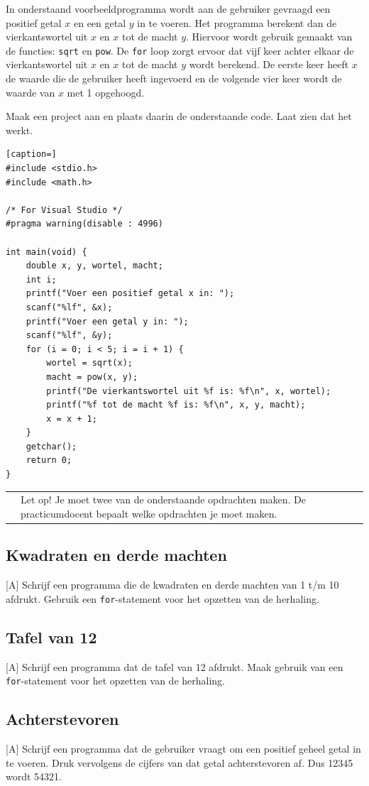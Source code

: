 \documentclass[a4paper,10pt,fleqn,twoside]{article}
\newcommand{\letop}{%
\vspace{4ex plus 1ex minus 1ex}
\begin{mdframed}[outerlinewidth = 1 ,%
roundcorner = 4 pt,%
leftmargin = 40,%
rightmargin = 40,%
backgroundcolor = yellow!40,%
outerlinecolor = red!70!black,%
innertopmargin = \topskip,%
splittopskip = \topskip,%
]
\begin{tabularx}{\linewidth}{m{1cm}X}
\Large\leftpointright & Let op! Je moet twee van de onderstaande opdrachten maken. De practicumdocent bepaalt welke opdrachten je moet maken.
\end{tabularx}
\end{mdframed}
\vspace{4ex plus 1ex minus 1ex}
}
\begin{document}
In onderstaand voorbeeldprogramma wordt aan de gebruiker gevraagd een positief getal $x$ en een getal $y$ in te voeren. Het programma berekent dan de vierkantswortel uit $x$ en $x$ tot de macht $y$. Hiervoor wordt gebruik gemaakt van de functies: \lstinline|sqrt| en \lstinline|pow|. De \lstinline|for| loop zorgt ervoor dat vijf keer achter elkaar de vierkantswortel uit $x$ en $x$ tot de macht $y$ wordt berekend. De eerste keer heeft $x$ de waarde die de gebruiker heeft ingevoerd en de volgende vier keer wordt de waarde van $x$ met 1 opgehoogd.

Maak een project aan en plaats daarin de onderstaande code. Laat zien dat het werkt.

\begin{lstlisting}[caption=]
#include <stdio.h>
#include <math.h>

/* For Visual Studio */
#pragma warning(disable : 4996)

int main(void) {
    double x, y, wortel, macht;
    int i;
    printf("Voer een positief getal x in: ");
    scanf("%lf", &x);
    printf("Voer een getal y in: ");
    scanf("%lf", &y);
    for (i = 0; i < 5; i = i + 1) {
        wortel = sqrt(x);
        macht = pow(x, y);
        printf("De vierkantswortel uit %f is: %f\n", x, wortel);
        printf("%f tot de macht %f is: %f\n", x, y, macht);
        x = x + 1;
    }
    getchar();
    return 0;
}
\end{lstlisting}

\letop
\clearpage

\subsection{Kwadraten en derde machten}[A]
Schrijf een programma die de kwadraten en derde machten van 1 t/m 10 afdrukt. Gebruik een \lstinline|for|-statement voor het opzetten van de herhaling.

\subsection{Tafel van 12}[A]
Schrijf een programma dat de tafel van 12 afdrukt. Maak gebruik van een \lstinline|for|-statement voor het opzetten van de herhaling.

\subsection{Achterstevoren}[A]
Schrijf een programma dat de gebruiker vraagt om een positief geheel getal in te voeren. Druk vervolgens de cijfers van dat getal achterstevoren af. Dus 12345 wordt 54321.
\end{document}
